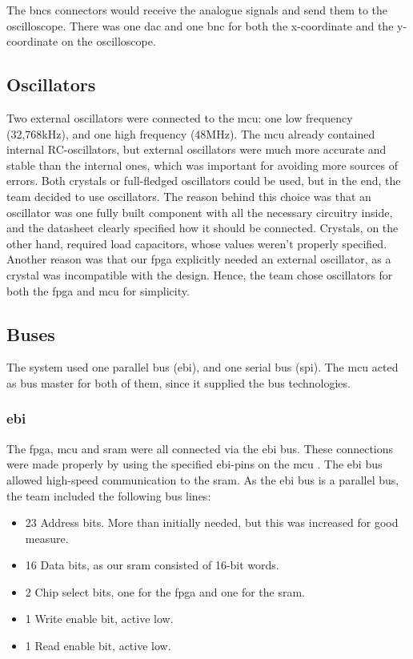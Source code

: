 The \gls{bnc}s connectors would receive the analogue signals and send them to the oscilloscope.
There was one \gls{dac} and one \gls{bnc} for both the x-coordinate and the y-coordinate on the oscilloscope.

\subsection{Oscillators}
Two external oscillators were connected to the \gls{mcu}: one low frequency (32,768kHz), and one high frequency (48MHz).
The \gls{mcu} already contained internal RC-oscillators, but external oscillators were much more accurate and stable than the internal ones, which was important for avoiding more sources of errors.
Both crystals or full-fledged oscillators could be used, but in the end, the team decided to use oscillators.
The reason behind this choice was that an oscillator was one fully built component with all the necessary circuitry inside, and the datasheet clearly specified how it should be connected.
Crystals, on the other hand, required load capacitors, whose values weren't properly specified.
Another reason was that our \gls{fpga} explicitly needed an external oscillator, as a crystal was incompatible with the design.
Hence, the team chose oscillators for both the \gls{fpga} and \gls{mcu} for simplicity.

\subsection{Buses}
The system used one parallel bus (\gls{ebi}), and one serial bus (\gls{spi}).
The \gls{mcu} acted as bus master for both of them, since it supplied the bus technologies.

\subsubsection{\gls{ebi}}
The \gls{fpga}, \gls{mcu} and \gls{sram} were all connected via the \gls{ebi} bus.
These connections were made properly by using the specified \gls{ebi}-pins on the \gls{mcu} \cite[sec. 4.1]{efm32-datasheet}.
The \gls{ebi} bus allowed high-speed communication to the \gls{sram}.
As the \gls{ebi} bus is a parallel bus, the team included the following bus lines:

\begin{itemize}
\item 23 Address bits. More than initially needed, but this was increased for good measure.
\item 16 Data bits, as our \gls{sram} consisted of 16-bit words.
\item 2 Chip select bits, one for the \gls{fpga} and one for the \gls{sram}.
\item 1 Write enable bit, active low.
\item 1 Read enable bit, active low.
\end{itemize}

